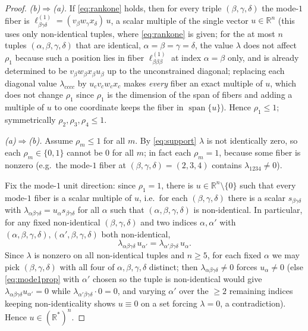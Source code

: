 \documentclass[12pt]{article}
\DeclareMathOperator{\spanop}{span}
\newcommand{\bR}{\mathbb{R}}
\theoremstyle{definition}
\begin{document}
\begin{proof}
\emph{(b)$\Rightarrow$(a).}  If \eqref{eq:rankone} holds, then for every triple
$(\beta,\gamma,\delta)$ the mode-$1$ fiber is
$\ell^{(1)}_{\beta\gamma\delta}=(v_\beta w_\gamma x_\delta)\,u$, a scalar multiple of
the single vector $u\in\bR^n$ (this uses only non-identical tuples, where
\eqref{eq:rankone} is given; for the at most $n$ tuples $(\alpha,\beta,\gamma,\delta)$
that are identical, $\alpha=\beta=\gamma=\delta$, the value $\lambda$ does not affect
$\rho_1$ because such a position lies in fiber $\ell^{(1)}_{\beta\beta\beta}$ at index
$\alpha=\beta$ only, and is already determined to be $v_\beta w_\beta x_\beta u_\beta$
up to the unconstrained diagonal; replacing each diagonal value $\lambda_{cccc}$ by
$u_cv_cw_cx_c$ makes \emph{every} fiber an exact multiple of $u$, which does not
change $\rho_1$ since $\rho_1$ is the dimension of the span of fibers and adding a
multiple of $u$ to one coordinate keeps the fiber in $\spanop\{u\}$).  Hence
$\rho_1\le1$; symmetrically $\rho_2,\rho_3,\rho_4\le1$.

\emph{(a)$\Rightarrow$(b).}  Assume $\rho_m\le1$ for all $m$.  By \eqref{eq:support}
$\lambda$ is not identically zero, so each $\rho_m\in\{0,1\}$ cannot be $0$ for all
$m$; in fact each $\rho_m=1$, because some fiber is nonzero (e.g.\ the mode-$1$
fiber at $(\beta,\gamma,\delta)=(2,3,4)$ contains $\lambda_{1234}\neq0$).

Fix the mode-$1$ unit direction: since $\rho_1=1$, there is $u\in\bR^n\setminus\{0\}$
such that every mode-$1$ fiber is a scalar multiple of $u$, i.e.\ for each
$(\beta,\gamma,\delta)$ there is a scalar $s_{\beta\gamma\delta}$ with
$\lambda_{\alpha\beta\gamma\delta}=u_\alpha s_{\beta\gamma\delta}$ for all $\alpha$
such that $(\alpha,\beta,\gamma,\delta)$ is non-identical.  In particular, for any
fixed non-identical $(\beta,\gamma,\delta)$ and two indices $\alpha,\alpha'$ with
$(\alpha,\beta,\gamma,\delta),(\alpha',\beta,\gamma,\delta)$ both non-identical,
\begin{equation}\label{eq:mode1prop}
\lambda_{\alpha\beta\gamma\delta}\,u_{\alpha'}
=\lambda_{\alpha'\beta\gamma\delta}\,u_\alpha .
\end{equation}
Since $\lambda$ is nonzero on all non-identical tuples and $n\ge5$, for each fixed
$\alpha$ we may pick $(\beta,\gamma,\delta)$ with all four of $\alpha,\beta,\gamma,
\delta$ distinct; then $\lambda_{\alpha\beta\gamma\delta}\neq0$ forces $u_\alpha\neq0$
(else \eqref{eq:mode1prop} with $\alpha'$ chosen so the tuple is non-identical would
give $\lambda_{\alpha\beta\gamma\delta}u_{\alpha'}=0$ while
$\lambda_{\alpha'\beta\gamma\delta}\cdot0=0$, and varying $\alpha'$ over the $\ge2$
remaining indices keeping non-identicality shows $u\equiv0$ on a set forcing
$\lambda=0$, a contradiction).  Hence $u\in(\bR^*)^n$.


\end{proof}
\end{document}
